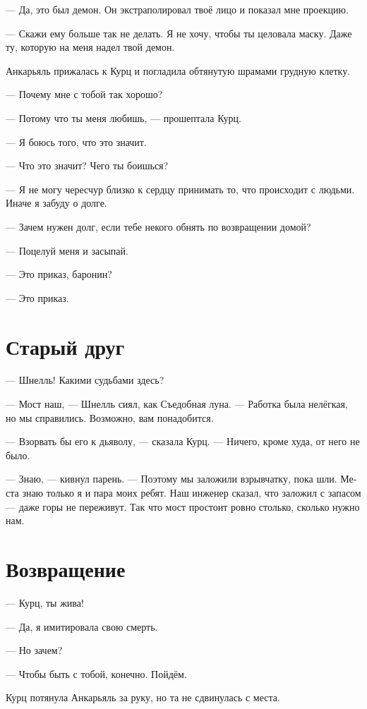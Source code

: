 \documentclass[a4paper,10pt,fleqn]{book}\usepackage{polyglossia}\setdefaultlanguage[babelshorthands=true]{russian}\setotherlanguage{english}\defaultfontfeatures{Ligatures=TeX,Mapping=tex-text}\usepackage{xcolor}\newcommand{\ml}[3]{#2}
\begin{document}
--- Да, это был демон.
Он экстраполировал твоё лицо и показал мне проекцию.

--- Скажи ему больше так не делать.
Я не хочу, чтобы ты целовала маску.
Даже ту, которую на меня надел твой демон.

Анкарьяль прижалась к Курц и погладила обтянутую шрамами грудную клетку.

--- Почему мне с тобой так хорошо?

--- Потому что ты меня любишь, --- прошептала Курц.

--- Я боюсь того, что это значит.

--- Что это значит?
Чего ты боишься?

--- Я не могу чересчур близко к сердцу принимать то, что происходит с людьми.
Иначе я забуду о долге.

--- Зачем нужен долг, если тебе некого обнять по возвращении домой?

--- Поцелуй меня и засыпай.

--- Это приказ, баронин?

--- Это приказ.

\section{Старый друг}

--- Шнелль!
Какими судьбами здесь?

--- Мост наш, --- Шнелль сиял, как Съедобная луна.
--- Работка была нелёгкая, но мы справились.
Возможно, вам понадобится.

--- Взорвать бы его к дьяволу, --- сказала Курц.
--- Ничего, кроме худа, от него не было.

--- Знаю, --- кивнул парень.
--- Поэтому мы заложили взрывчатку, пока шли.
Места знаю только я и пара моих ребят.
Наш инженер сказал, что заложил с запасом --- даже горы не переживут.
Так что мост простоит ровно столько, сколько нужно нам.

\section{Возвращение}

--- Курц, ты жива!

--- Да, я имитировала свою смерть.

--- Но зачем?

--- Чтобы быть с тобой, конечно.
Пойдём.

Курц потянула Анкарьяль за руку, но та не сдвинулась с места.
\end{document}
